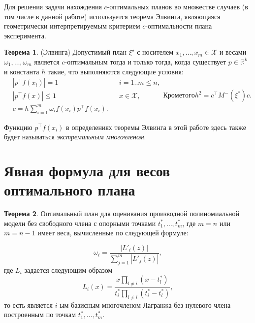 \documentclass[specialist,
               substylefile = spbu.rtx,
               subf,href,colorlinks=true, 12pt]{disser}
\theoremstyle{definition}
\newtheorem{theorem}{Теорема}
\newcommand\abs[1]{\left\lvert#1\right\rvert}
\begin{document}
  Для решения задачи нахождения $c$-оптимальных планов во множестве случаев (в том числе в данной работе) используется теорема Элвинга, являющаяся геометрически интерпретируемым критерием $c$-оптимальности плана эксперимента.
  \begin{theorem}
  \label{th:elfving}
  (Элвинга) \cite{melas2010}
  Допустимый план $\xi^\star$ с носителем $x_1, \ldots, x_m \in \mathcal{X}$ и весами $\omega_1, \ldots, \omega_m$ является $c$-оптимальным тогда и только тогда, когда существует $p \in \mathbb{R}^k$ и константа $h$ такие, что выполняются следующие условия:
  \begin{subequations}
  \label{eq:elfving}
  \begin{align}
	&\abs{p^\top f(x_i)} = 1 &&i=1..m \leqslant n \label{eq:elfving:eq1} ,\\
	&\abs{p^\top f(x)} \leqslant 1  &&x \in \mathcal{X} \label{eq:elfving:eq2} ,\\
	&c = h \sum_{i=1}^m \omega_i f(x_i) p^\top f(x_i) \label{eq:elfving:eq3}.
  \end{align}
  Кроме того
  \begin{equation*}
  	h^2 = c^\top M^{-}(\xi^{*})c.
  \end{equation*}
  \end{subequations}
  \end{theorem}
	Функцию $p^\top f(x_i)$ в определениях теоремы Элвинга в этой работе здесь также будет называться \textit{экстремальным многочленом}.
	
	\section{Явная формула для весов оптимального плана}
	
	\begin{theorem} \cite{melasmain}
	\label{th:weights}
	Оптимальный план для оценивания производной полиномиальной модели без свободного члена с опорными точками $t_1^*, \ldots, t_m^*$, где $m=n$ или $m=n-1$ имеет веса, вычисленные по следующей формуле:	
	
	\begin{equation}
	\label{eq:weights}
		\omega_i = \frac{\abs{L'_i(z)}}{\sum_{j=1}^m \abs{L'_j(z)}},
	\end{equation}
	где $L_i$ задается следующим образом
	\begin{equation}
		\label{eq:lagr}
		L_{i}(x) = \frac{x \prod_{l \neq i} (x - t_l^*)}{t_i^* \prod_{l \neq i} (t_i^* - t_l^*)},
	\end{equation}	
	то есть является $i$-ым базисным многочленом Лагранжа без нулевого члена построенным по точкам $t_1^*, \ldots, t_m^*$.
	\end{theorem}
	
\end{document}
